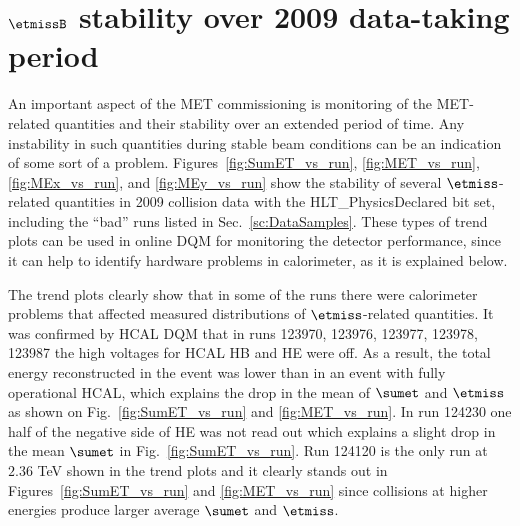 \section[$\etmiss$ stability over 2009 data-taking period]{$\etmissB$ stability over 2009 data-taking period}
\label{sc:METStab}

An important aspect of the MET commissioning is monitoring of the
MET-related quantities and their stability over an extended period of
time. Any instability in such quantities during stable beam conditions
can be an indication of some sort of a problem.
Figures~\ref{fig:SumET_vs_run}, \ref{fig:MET_vs_run},
\ref{fig:MEx_vs_run}, and \ref{fig:MEy_vs_run} show the stability of
several $\etmiss$-related quantities in 2009 collision data with the
HLT\_PhysicsDeclared bit set, including the ``bad'' runs listed in
Sec.~\ref{sc:DataSamples}. These types of trend plots can be used in online DQM
for monitoring the detector performance, since it can help to identify
hardware problems in calorimeter, as it is explained below.

The trend plots clearly show that in some of the runs there
were calorimeter problems that affected measured distributions 
of $\etmiss$-related quantities. It was
confirmed by HCAL DQM that in runs 123970, 123976, 123977,
123978, 123987 the high voltages for HCAL HB and HE were off. As
a result, the total energy reconstructed in the event was lower than in
an event with fully operational HCAL, which explains the drop in
the mean of $\sumet$ and $\etmiss$ as shown on
Fig.~\ref{fig:SumET_vs_run} and \ref{fig:MET_vs_run}. 
In run 124230 one half of the negative side of HE was not read out which
explains a slight drop in the mean $\sumet$ in Fig.~\ref{fig:SumET_vs_run}.
Run 124120 is the only run at $2.36$ TeV shown in the trend plots and it clearly stands out in
Figures~\ref{fig:SumET_vs_run} and \ref{fig:MET_vs_run} since collisions at higher energies
produce larger average $\sumet$ and $\etmiss$.

